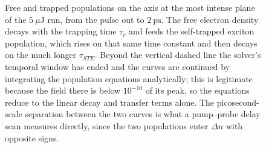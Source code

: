 \begin{figure}[htbp]
    \centering
    \caption{Free and trapped populations on the axis at the most intense plane of the $5\ \mu$J run, from the pulse out to $2\ \text{ps}$. The free electron density decays with the trapping time $\tau_r$ and feeds the self-trapped exciton population, which rises on that same time constant and then decays on the much longer $\tau_{STE}$. Beyond the vertical dashed line the solver's temporal window has ended and the curves are continued by integrating the population equations analytically; this is legitimate because the field there is below $10^{-10}$ of its peak, so the equations reduce to the linear decay and transfer terms alone. The picosecond-scale separation between the two curves is what a pump--probe delay scan measures directly, since the two populations enter $\Delta n$ with opposite signs.}
    \label{fig:rep_trapping}
\end{figure}
